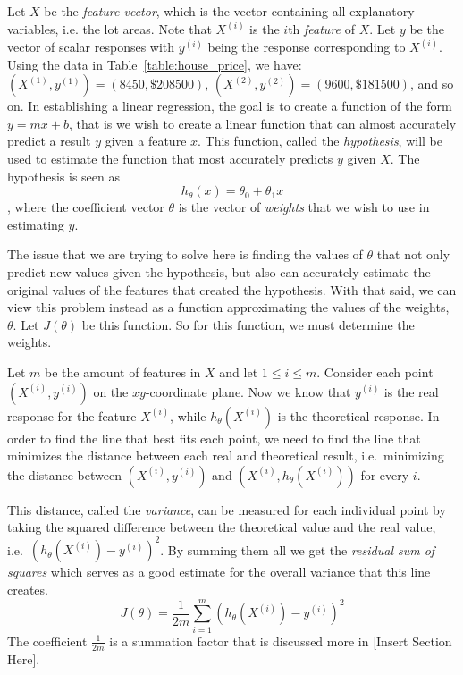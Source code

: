 \documentclass{book}[a5paper]
\newcommand{\placeholder}{[Insert Section Here]}
\begin{document}
Let $X$ be the \emph{feature vector}, which is the vector containing all
explanatory variables, i.e. the lot areas. Note that $X^{(i)}$ is the $i$th \emph{feature} of $X$.
Let $y$ be the vector of scalar responses with $y^{(i)}$ being the response corresponding to $X^{(i)}$. Using the data in Table~\ref{table:house_price}, we have: $(X^{(1)}, y^{(1)}) = (8450, \$208500)$, $(X^{(2)}, y^{(2)}) = (9600, \$181500)$, and so on. In establishing a linear regression, the
goal is to create a function of the form $y=mx+b$, that is we wish to create a
linear function that can almost accurately predict a result $y$ given a feature
$x$. This function, called the \emph{hypothesis}, will be used to estimate the
function that most accurately predicts $y$ given $X$. The hypothesis is seen as 
\begin{equation}
    h_{\theta}(x) = \theta_0 + \theta_1x
\end{equation}
, where the coefficient vector $\theta$ is the vector of \emph{weights} that we
wish to use in estimating $y$.

The issue that we are trying to solve here is finding the values of ${\theta}$
that not only predict new values given the hypothesis, but also can accurately
estimate the original values of the features that created the hypothesis. With
that said, we can view this problem instead as a function approximating the
values of the weights, $\theta$. Let $J(\theta)$ be this function. So for this
function, we must determine the weights.

Let $m$ be the amount of features in $X$ and let $1 \leq i \leq m$. Consider
each point $(X^{(i)}, y^{(i)})$ on the $xy$-coordinate plane. Now we know that
$y^{(i)}$ is the real response for the feature $X^{(i)}$, while
$h_{\theta}(X^{(i)})$ is the theoretical response. In order to find the line
that best fits each point, we need to find the line that minimizes the distance
between each real and theoretical result, i.e.\ minimizing the distance between
$(X^{(i)}, y^{(i)})$ and $(X^{(i)}, h_{\theta}(X^{(i)}))$ for every $i$. 

This distance, called the \emph{variance}, can be measured for each individual
point by taking the squared difference between the theoretical value and the
real value, i.e.\  $(h_{\theta}(X^{(i)}) - y^{(i)})^2$. By summing them all we
get the \emph{residual sum of squares} which serves as a good estimate for the
overall variance that this line creates.
\begin{equation}
	J(\theta) = \frac{1}{2m}\sum_{i=1}^m(h_{\theta}(X^{(i)}) - y^{(i)})^2	
\end{equation}
The coefficient $\frac{1}{2m}$ is a summation factor that is discussed more in \placeholder.
 
\end{document}
